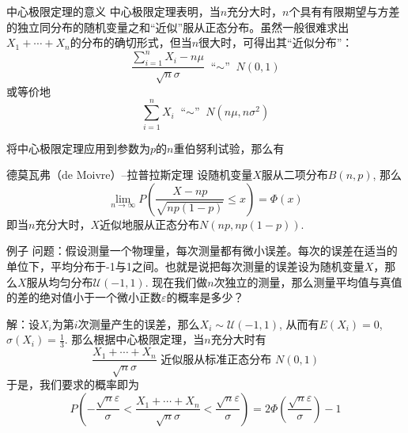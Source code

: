 \documentclass[10pt]{beamer}
\begin{document}

\begin{frame}

\begin{block}{中心极限定理的意义}
中心极限定理表明，当$n$充分大时，$n$个具有有限期望与方差的独立同分布的随机变量之和``近似''服从正态分布。虽然一般很难求出$X_1+\cdots+X_n$的分布的确切形式，但当$n$很大时，可得出其``近似分布''：
$$\dfrac{\sum\limits_{i=1}^n X_i - n\mu}{\sqrt{n}\sigma} \; \text{``$\sim$''} \; N(0,1)$$
或等价地
$$\sum\limits_{i=1}^n X_i \; \text{``$\sim$''} \; N(n\mu,n\sigma^2)$$
\end{block}

\end{frame}


\begin{frame}

将中心极限定理应用到参数为$p$的$n$重伯努利试验，那么有
\vspace{0.5em}
\begin{block}{德莫瓦弗（de Moivre）--拉普拉斯定理}
设随机变量$X$服从二项分布$B(n,p)$, 那么
$$\lim\limits_{n\to\infty} P\left( \dfrac{X - np}{\sqrt{np(1-p)}} \le x \right) = \Phi(x)$$
即当$n$充分大时，$X$近似地服从正态分布$N(np,np(1-p))$.
\end{block}

\end{frame}


\begin{frame}

\begin{block}{例子}
问题：假设测量一个物理量，每次测量都有微小误差。每次的误差在适当的单位下，平均分布于-1与1之间。也就是说把每次测量的误差设为随机变量$X$，那么$X$服从均匀分布$\mathcal{U}(-1,1)$. 现在我们做$n$次独立的测量，那么测量平均值与真值的差的绝对值小于一个微小正数$\varepsilon$的概率是多少？

\vspace{1em}
\pause

解：设$X_i$为第$i$次测量产生的误差，那么$X_i \sim \mathcal{U}(-1,1)$, 从而有$E(X_i) = 0$, $\sigma(X_i) = \frac{1}{3}$. 那么根据中心极限定理，当$n$充分大时有
$$\dfrac{X_1+\cdots+X_n}{\sqrt{n}\sigma} \text{ 近似服从标准正态分布 } N(0,1)$$
于是，我们要求的概率即为
$$P\left( -\dfrac{\sqrt{n}\varepsilon}{\sigma} < \dfrac{X_1+\cdots+X_n}{\sqrt{n}\sigma} < \dfrac{\sqrt{n}\varepsilon}{\sigma} \right) = 2\Phi\left( \dfrac{\sqrt{n}\varepsilon}{\sigma} \right) - 1$$
\end{block}

\end{frame}
\end{document}
